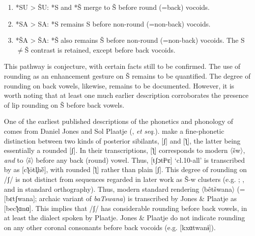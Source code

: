 \documentclass[output=paper,newtxmath,modfonts,nonflat,hidelinks]{langsci/langscibook}
\begin{document}
\begin{enumerate}
\begin{enumerate}
\item *SU > ŠU: *S and *Š merge to Š before round (=back) vocoids.
\item *SA > SA: *S remains S before non-round (=non-back) vocoids.
\item *ŠA > ŠA: *Š also remains Š before non-round (=non-back) vocoids. The S${\neq}$Š contrast is retained, except before back vocoids.
\end{enumerate}

\end{enumerate}

This pathway is conjecture, with certain facts still to be confirmed. The use of rounding as an enhancement gesture on Š remains to be quantified. The degree of rounding on back vowels, likewise, remains to be documented. However, it is worth noting that at least one much earlier description corroborates the presence of lip rounding on Š before back vowels.

One of the earliest published descriptions of the phonetics and phonology of  comes from Daniel Jones and Sol Plaatje (\citealt{Jones&Plaatje1916}, \textit{et seq}.). \citet[xx.32]{Jones&Plaatje1916} make a fine-phonetic distinction between two kinds of posterior sibilants, [ʃ] and [ƪ], the latter being essentially a rounded [ʃ]. In their transcriptions, [ƪ] corresponds to modern 〈šw〉, \textit{and} to 〈š〉 before any back (round) vowel.  Thus, [tʃɔtɬʰɛ] ‘cl.10-all’ is transcribed by \citet[3]{Jones&Plaatje1916} as [cƪ\={o}tl̥h\={e}\v{}], with rounded [ƪ] rather than plain [ʃ]. This degree of rounding on /ʃ/ is not distinct from sequences regarded in later work as Š-w clusters (e.g. \citealt{Cole1955}; \citealt{chebanneetal1997}, and in standard orthography). Thus, modern standard rendering 〈bêtšwana〉 (= [bɛtʃwana]; archaic variant of \textit{baTswana}) is transcribed by Jones \& Plaatje as [becƪɑnɑ]. This implies that /ʃ/ has considerable rounding before back vowels, in at least the  dialect spoken by Plaatje. Jones \& Plaatje do not indicate rounding on any other coronal consonants before back vocoids (e.g. [kxɑtwanɨ]).
\end{document}

